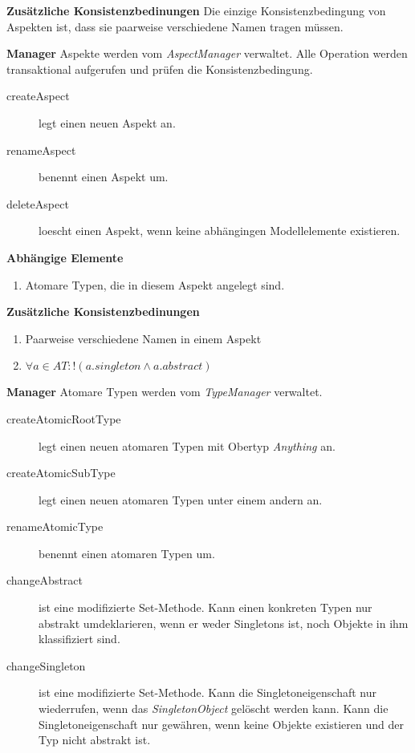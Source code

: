 
\textbf{Zusätzliche Konsistenzbedinungen} \newline
Die einzige Konsistenzbedingung von Aspekten ist, dass sie paarweise verschiedene Namen tragen müssen. 

\textbf{Manager} \newline
Aspekte werden vom \emph{AspectManager} verwaltet. Alle Operation werden transaktional aufgerufen und prüfen die Konsistenzbedingung. 

\begin{description}
\item[createAspect] legt einen neuen Aspekt an.
\item[renameAspect] benennt einen Aspekt um.
\item[deleteAspect] loescht einen Aspekt, wenn keine abhängingen Modellelemente existieren.
\end{description}

\textbf{Abhängige Elemente}
\begin{enumerate}
  		\item Atomare Typen, die in diesem Aspekt angelegt sind.
\end{enumerate}



\textbf{Zusätzliche Konsistenzbedinungen}
\begin{enumerate}
  		\item Paarweise verschiedene Namen in einem Aspekt
  		\item \(\forall a \in AT : !(a.singleton \land a.abstract) \)
\end{enumerate}

\textbf{Manager} \newline
Atomare Typen werden vom \emph{TypeManager} verwaltet. 

\begin{description}
\item[createAtomicRootType] legt einen neuen atomaren Typen mit Obertyp \emph{Anything} an. 
\item[createAtomicSubType] legt einen neuen atomaren Typen unter einem andern an. 
\item[renameAtomicType] benennt einen atomaren Typen um. 
\item[changeAbstract] ist eine modifizierte Set-Methode. Kann einen konkreten Typen nur abstrakt umdeklarieren, wenn er weder Singletons ist, noch 
Objekte in ihm klassifiziert sind.
\item[changeSingleton] ist eine modifizierte Set-Methode. Kann die Singletoneigenschaft nur wiederrufen, wenn das \emph{SingletonObject} gelöscht werden kann. 
 Kann die Singletoneigenschaft nur gewähren, wenn keine Objekte existieren und der Typ nicht abstrakt ist. 
\end{description}


